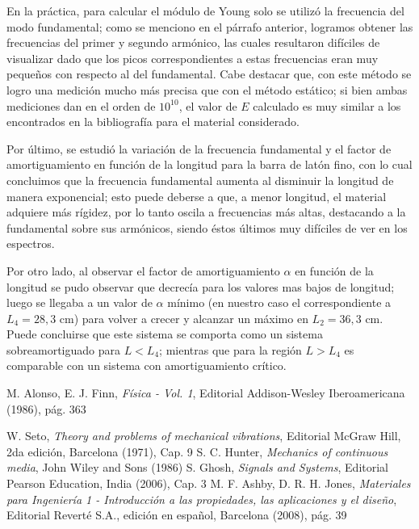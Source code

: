 \documentclass[twoside,twocolumn,a4paper]{article}
\begin{document}
En la pr\'actica, para calcular el m\'odulo de Young solo se utiliz\'o la frecuencia del modo fundamental; como se menciono en el p\'arrafo anterior, logramos obtener las frecuencias del primer y segundo arm\'onico, las cuales resultaron dif\'iciles de visualizar dado que los picos correspondientes a estas frecuencias eran muy peque\~nos con respecto al del fundamental. Cabe destacar que, con este m\'etodo se logro una medici\'on mucho m\'as precisa que con el m\'etodo est\'atico; si bien ambas mediciones dan en el orden de $10^{10}$, el valor de $E$ calculado es muy similar a los encontrados en la bibliograf\'ia para el material considerado.\newline

Por \'ultimo, se estudi\'o la variaci\'on de la frecuencia fundamental y el factor de amortiguamiento en funci\'on de la longitud para la barra de lat\'on fino, con lo cual concluimos que
la frecuencia fundamental aumenta al disminuir la longitud de manera exponencial; esto puede deberse a que, a menor longitud, el material adquiere m\'as r\'igidez, por lo tanto oscila a frecuencias m\'as altas, destacando a la fundamental sobre sus arm\'onicos, siendo \'estos \'ultimos muy dif\'iciles de ver en los espectros. \newline

Por otro lado, al observar el factor de amortiguamiento $\alpha$ en funci\'on de la longitud se pudo observar que decrec\'ia para los valores mas bajos de longitud; luego se llegaba a un valor de $\alpha$ m\'inimo (en nuestro caso el correspondiente a $L_{4} = 28,3$ cm) para volver a crecer y alcanzar un m\'aximo en $L_{2} = 36,3$ cm. Puede concluirse que este sistema se comporta como un sistema sobreamortiguado para $L < L_{4}$; mientras que para la regi\'on $L > L_{4}$ es comparable con un sistema con amortiguamiento cr\'itico. 

\newpage
\begin{thebibliography}{99} %


 M. Alonso, E. J. Finn, \textit{F\'isica - Vol. 1}, Editorial Addison-Wesley Iberoamericana (1986), p\'ag. 363

 W. Seto, \textit{Theory and problems of mechanical vibrations}, Editorial McGraw Hill, 2da edici\'on, Barcelona (1971), Cap. 9
 S. C. Hunter, \textit{Mechanics of continuous media}, John Wiley and Sons (1986)
 S. Ghosh, \textit{Signals and Systems}, Editorial Pearson Education, India (2006), Cap. 3
 M. F. Ashby, D. R. H. Jones, \textit{Materiales para Ingenier\'ia 1 - Introducci\'on a las propiedades, las aplicaciones y el dise\~no}, Editorial Revert\'e S.A., edici\'on en espa\~nol, Barcelona (2008), p\'ag. 39

 
\end{thebibliography}


\end{document}
